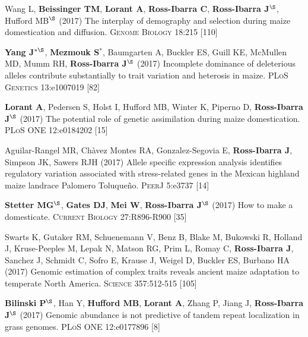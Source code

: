 \documentclass[letterpaper,10pt]{article}
\begin{document}
\begin{etaremune}
\item Wang L, \textbf{Beissinger TM}, \textbf{Lorant A}, \textbf{Ross-Ibarra C}, \textbf{Ross-Ibarra J}$^\S$, Hufford MB$^\S$ (2017) The interplay of demography and selection during maize domestication and diffusion. \textsc{Genome Biology} 18:215
 [110]\\

\item {\bf Yang J}$^{*\S}$, {\bf Mezmouk S}$^*$, Baumgarten A, Buckler ES, Guill KE, McMullen MD, Mumm RH, {\bf Ross-Ibarra J}$^\S$ (2017) Incomplete dominance of deleterious alleles contribute substantially to trait variation and heterosis in maize. \textsc{PLoS Genetics} 13:e1007019
 [82]\\

\item \textbf{Lorant A}, Pedersen S, Holst I, Hufford MB, Winter K, Piperno D, \textbf{Ross-Ibarra J}$^\S$ (2017) The potential role of genetic assimilation during maize domestication. \textsc{PLoS ONE} 12:e0184202
 [15]\\

\item Aguilar-Rangel MR, Ch\`{a}vez Montes RA,  Gonzalez-Segovia E, \textbf{Ross-Ibarra J}, Simpson JK, Sawers RJH (2017) Allele specific expression analysis identifies regulatory variation associated with stress-related genes in the Mexican highland maize landrace Palomero Toluque\~{n}o. \textsc{PeerJ} 5:e3737
 [14]\\

\item   {\bf Stetter MG}$^\S$, {\bf Gates DJ}, {\bf Mei W}, {\bf Ross-Ibarra J}$^\S$ (2017) How to make a domesticate. \textsc{Current Biology} 27:R896-R900
 [35]\\

\item Swarts K, Gutaker RM,   Schuenemann V,  Benz B,  Blake M, Bukowski R, Holland J, Kruse-Peeples M, Lepak N, Matson RG, Prim L, Romay C, {\bf Ross-Ibarra J}, Sanchez J, Schmidt C,  Sofro E,  Krause J,  Weigel D,  Buckler ES,  Burbano HA (2017) Genomic estimation of complex traits reveals ancient maize adaptation to temperate North America. \textsc{Science} 357:512-515
 [105]\\

\item {\bf Bilinski P}$^\S$, Han Y, {\bf Hufford MB}, {\bf Lorant A}, Zhang P, Jiang J, {\bf Ross-Ibarra J}$^\S$ (2017) Genomic abundance is not predictive of tandem repeat localization in grass genomes. \textsc{PLoS ONE} 12:e0177896
 [8]\\


\end{etaremune}
\end{document}
